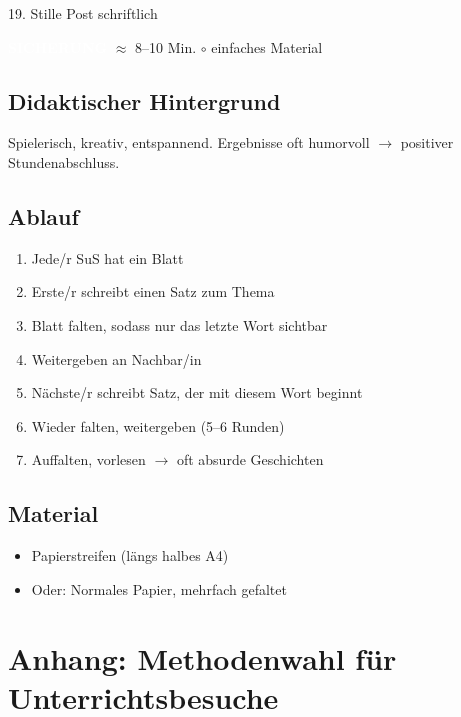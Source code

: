\documentclass[11pt, a4paper]{article}
\newcommand{\tagSicherung}{\colorbox{sicherung}{\textcolor{white}{\footnotesize\textbf{SICHERUNG}}}}
\newcommand{\zeit}[1]{\textcolor{grau}{\footnotesize $\approx$ #1 Min.}}
\newcommand{\matEinfach}{\textcolor{warnung}{$\circ$ einfaches Material}}
\begin{document}
\begin{methode}{19. Stille Post schriftlich}

\tagSicherung{} \zeit{8--10} \hfill \matEinfach

\subsection*{Didaktischer Hintergrund}
Spielerisch, kreativ, entspannend. Ergebnisse oft humorvoll $\rightarrow$ positiver Stundenabschluss.

\subsection*{Ablauf}
\begin{enumerate}[leftmargin=*]
    \item Jede/r SuS hat ein Blatt
    \item Erste/r schreibt einen Satz zum Thema
    \item Blatt falten, sodass nur das letzte Wort sichtbar
    \item Weitergeben an Nachbar/in
    \item Nächste/r schreibt Satz, der mit diesem Wort beginnt
    \item Wieder falten, weitergeben (5--6 Runden)
    \item Auffalten, vorlesen $\rightarrow$ oft absurde Geschichten
\end{enumerate}

\subsection*{Material}
\begin{materialbox}
\begin{itemize}[label=$\square$, leftmargin=*]
    \item Papierstreifen (längs halbes A4)
    \item Oder: Normales Papier, mehrfach gefaltet
\end{itemize}
\end{materialbox}

\end{methode}

\newpage


\section*{Anhang: Methodenwahl für Unterrichtsbesuche}
\end{document}
